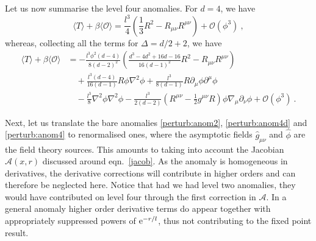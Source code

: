 \documentclass[a4paper,12pt]{article}
\begin{document}
Let us now summarise the level four anomalies. For $d=4$, we have 
\begin{equation}
\label{perturb:anom4d}
  \langle T \rangle +\beta \langle \mathcal{O}\rangle = \frac{l^3}4
  \left( \frac13 R^2 -R_{\mu\nu}R^{\mu\nu} \right)
  +\mathcal{O}(\phi^3)~,
\end{equation}
whereas, collecting all the terms for $\Delta=d/2+2$, we have
\begin{equation}
\label{perturb:anom4}
\begin{split}
  \langle T \rangle +\beta \langle \mathcal{O}\rangle &= - \frac{l^3
  \phi^2 (d-4)}{8(d-2)^2} \left( \frac{d^3-4d^2+16d-16}{16 (d-1)^2}
  R^2 - R_{\mu\nu} R^{\mu\nu} \right) \\
  &\quad + \frac{l^3(d-4)}{16(d-1)} R \phi\nabla^2 \phi +
  \frac{l^3}{8(d-1)} R \partial_\mu \phi \partial^\mu \phi \\
  &\quad - \frac{l^3}8 \nabla^2 \phi \nabla^2 \phi
  - \frac{l^3}{2(d-2)} \left( R^{\mu\nu} -\frac12 g^{\mu\nu} R \right)
  \phi \nabla_\mu \partial_\nu \phi +\mathcal{O}(\phi^3)~.
\end{split}
\end{equation}

Next, let us translate the bare anomalies
\eqref{perturb:anom2}, \eqref{perturb:anom4d} and
\eqref{perturb:anom4} to renormalised ones, where the asymptotic
fields $\hat{g}_{\mu\nu}$ and $\hat{\phi}$ are the field theory
sources.
This amounts to taking into account the Jacobian $\mathcal{A}(x,r)$ discussed 
around eqn.\ \eqref{jacob}. As the anomaly is homogeneous in derivatives, the
derivative corrections will contribute in higher orders and can therefore 
be neglected
here. Notice that had we had level two 
anomalies, they 
would have contributed  on level four through the first correction in 
$\mathcal{A}$. 
In a general anomaly higher order derivative terms do appear 
together with appropriately suppressed powers of $\mathrm{e}^{-r/l}$, thus not 
contributing to the fixed point result.    
\end{document}
